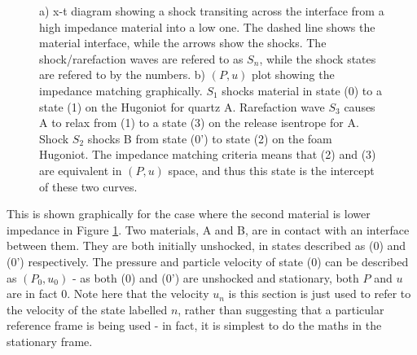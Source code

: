 \begin{figure}
\centering     %
{}
\caption{ \label{fig:ShockDiagramAndIMTheory1} a) x-t diagram showing a shock transiting across the interface from a high impedance material into a low one. The dashed line shows the material interface, while the arrows show the shocks. The shock/rarefaction waves are refered to as $S_n$, while the shock states are refered to by the numbers. b) $(P,u)$ plot showing the impedance matching graphically. $S_1$ shocks material in state (0) to a state (1) on the Hugoniot for quartz A. Rarefaction wave $S_3$ causes A to relax from (1) to a state (3) on the release isentrope for A. Shock $S_2$ shocks B from state (0') to state (2) on the foam Hugoniot. The impedance matching criteria means that (2) and (3) are equivalent in $(P,u)$ space, and thus this state is the intercept of these two curves.}
\end{figure}

This is shown graphically for the case where the second material is lower impedance in Figure \ref{fig:ShockDiagramAndIMTheory1}. Two materials, A and B, are in contact with an interface between them. They are both initially unshocked, in states described as (0) and (0') respectively. The pressure and particle velocity of state (0) can be described as $(P_0, u_0)$ - as both (0) and (0') are unshocked and stationary, both $P$ and $u$ are in fact 0. Note here that the velocity $u_n$ is this section is just used to refer to the velocity of the state labelled $n$, rather than suggesting that a particular reference frame is being used - in fact, it is simplest to do the maths in the stationary frame.

